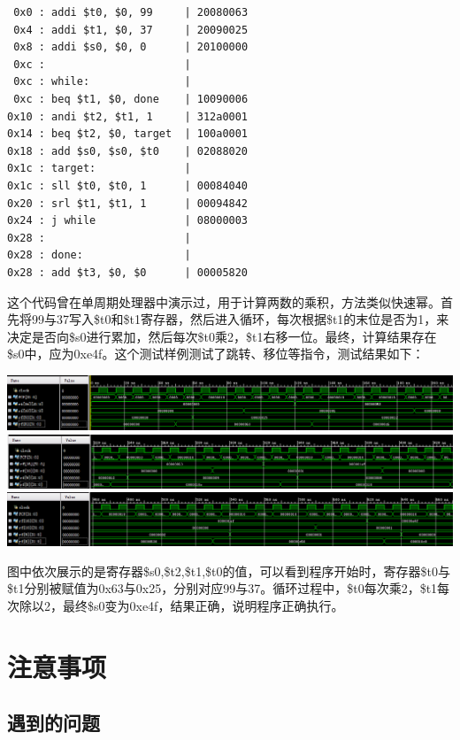 \documentclass[12pt]{article} %
\begin{document}
\begin{sloppypar}
\begin{lstlisting}
 0x0 : addi $t0, $0, 99     | 20080063
 0x4 : addi $t1, $0, 37     | 20090025
 0x8 : addi $s0, $0, 0      | 20100000
 0xc :                      | 
 0xc : while:               | 
 0xc : beq $t1, $0, done    | 10090006
0x10 : andi $t2, $t1, 1     | 312a0001
0x14 : beq $t2, $0, target  | 100a0001
0x18 : add $s0, $s0, $t0    | 02088020
0x1c : target:              | 
0x1c : sll $t0, $t0, 1      | 00084040
0x20 : srl $t1, $t1, 1      | 00094842
0x24 : j while              | 08000003
0x28 :                      | 
0x28 : done:                | 
0x28 : add $t3, $0, $0      | 00005820
\end{lstlisting} 

这个代码曾在单周期处理器中演示过，用于计算两数的乘积，方法类似快速幂。首先将99与37写入\$t0和\$t1寄存器，然后进入循环，每次根据\$t1的末位是否为1，来决定是否向\$s0进行累加，然后每次\$t0乘2，\$t1右移一位。最终，计算结果存在\$s0中，应为0xe4f。这个测试样例测试了跳转、移位等指令，测试结果如下：

\noindent
\includegraphics[width =\linewidth]{figure/mul1.png}
\includegraphics[width =\linewidth]{figure/mul2.png}
\includegraphics[width =\linewidth]{figure/mul3.png}

图中依次展示的是寄存器\$s0,\$t2,\$t1,\$t0的值，可以看到程序开始时，寄存器\$t0与\$t1分别被赋值为0x63与0x25，分别对应99与37。循环过程中，\$t0每次乘2，\$t1每次除以2，最终\$s0变为0xe4f，结果正确，说明程序正确执行。



\section{注意事项}

\subsection{遇到的问题}


\end{sloppypar}
\end{document}
